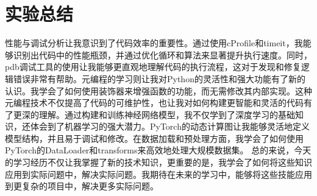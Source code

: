 \documentclass[a4paper, 12pt]{article}
\begin{document}
  \section{实验总结}
性能与调试分析让我意识到了代码效率的重要性。通过使用cProfile和timeit，我能够识别出代码中的性能瓶颈，并通过优化循环和算法来显著提升执行速度。同时，pdb调试工具的使用让我能够更直观地理解代码的执行流程，这对于发现和修复逻辑错误非常有帮助。元编程的学习则让我对Python的灵活性和强大功能有了新的认识。我学会了如何使用装饰器来增强函数的功能，而无需修改其内部实现。这种元编程技术不仅提高了代码的可维护性，也让我对如何构建更智能和灵活的代码有了更深的理解。通过构建和训练神经网络模型，我不仅学到了深度学习的基础知识，还体会到了机器学习的强大潜力。PyTorch的动态计算图让我能够灵活地定义模型结构，并且易于调试和修改。在数据加载和预处理方面，我学会了如何使用PyTorch的DataLoader和transforms来高效地处理大规模数据集。
总的来说，今天的学习经历不仅让我掌握了新的技术知识，更重要的是，我学会了如何将这些知识应用到实际问题中，解决实际问题。我期待在未来的学习中，能够将这些技能应用到更复杂的项目中，解决更多实际问题。
\end{document}
